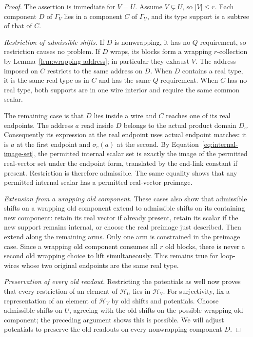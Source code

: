 \begin{proof}
The assertion is immediate for $V=U$. Assume $V\subsetneq U$, so
$|V|\leq r$. Each component $D$ of $\Gamma_V$ lies in a component
$C$ of $\Gamma_U$, and its type support is a subtree of that of $C$.

\emph{Restriction of admissible shifts.}
If $D$ is nonwrapping,
it has no $Q$ requirement, so restriction causes no problem. If $D$
wraps, its blocks form a wrapping $r$-collection by
Lemma~\ref{lem:wrapping-address}; in particular they exhaust $V$.
The address imposed on $C$ restricts to the same address on $D$.
When $D$ contains a real type, it is the same real type as in $C$ and
has the same $Q$ requirement. When $C$ has no real type, both supports
are in one wire interior and require the same common scalar.

The remaining case is that $D$ lies inside a wire and $C$ reaches one
of its real endpoints. The address $a$ read inside $D$ belongs to the
actual product domain $D_e$. Consequently its expression at the real
endpoint uses actual endpoint matches: it is $a$ at the first endpoint
and $\sigma_e(a)$ at the second. By
Equation~\eqref{eq:internal-image-set}, the permitted internal scalar
set is exactly the image of the permitted real-vector set under the
endpoint form, translated by the end-link constant if present.
Restriction is therefore admissible. The same equality shows that any
permitted internal scalar has a permitted real-vector preimage.

\emph{Extension from a wrapping old component.}
These cases also show that admissible shifts on a wrapping old component
extend to admissible shifts on its containing new component: retain its
real vector if already present, retain its scalar if the new support
remains internal, or choose the real preimage just described. Then
extend along the remaining arms. Only one arm is constrained in the
preimage case. Since a wrapping old component consumes all $r$ old
blocks, there is never a second old wrapping choice to lift
simultaneously. This remains true for loop-wires whose two original
endpoints are the same real type.

\emph{Preservation of every old readout.}
Restricting the potentials as well now proves that every restriction of
an element of $\mathcal H_U$ lies in $\mathcal H_V$. For surjectivity,
fix a representation of an element of $\mathcal H_V$ by old shifts and
potentials. Choose admissible shifts on $U$, agreeing with the old
shifts on the possible wrapping old component; the preceding argument
shows this is possible. We will adjust potentials to preserve the old
readouts on every nonwrapping component $D$.


\end{proof}
